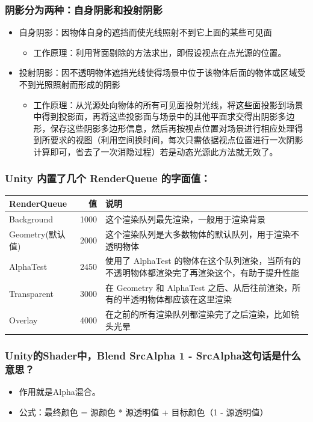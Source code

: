 \documentclass[9pt, b5paper]{article}
\begin{document}
\subsubsection{阴影分为两种：自身阴影和投射阴影}
\label{sec:org9d515b5}
\begin{itemize}
\item 自身阴影：因物体自身的遮挡而使光线照射不到它上面的某些可见面
\begin{itemize}
\item 工作原理：利用背面剔除的方法求出，即假设视点在点光源的位置。
\end{itemize}
\item 投射阴影：因不透明物体遮挡光线使得场景中位于该物体后面的物体或区域受不到光照照射而形成的阴影
\begin{itemize}
\item 工作原理：从光源处向物体的所有可见面投射光线，将这些面投影到场景中得到投影面，再将这些投影面与场景中的其他平面求交得出阴影多边形，保存这些阴影多边形信息，然后再按视点位置对场景进行相应处理得到所要求的视图（利用空间换时间，每次只需依据视点位置进行一次阴影计算即可，省去了一次消隐过程）若是动态光源此方法就无效了。
\end{itemize}
\end{itemize}
\subsubsection{Unity 内置了几个 RenderQueue 的字面值：}
\label{sec:orgd43ab68}
\begin{center}
\begin{tabular}{lrl}
\hline
RenderQueue & 值 & 说明\\
\hline
Background & 1000 & 这个渲染队列最先渲染，一般用于渲染背景\\
Geometry(默认值) & 2000 & 这个渲染队列是大多数物体的默认队列，用于渲染不透明物体\\
AlphaTest & 2450 & 使用了 AlphaTest 的物体在这个队列渲染，当所有的不透明物体都渲染完了再渲染这个，有助于提升性能\\
Transparent & 3000 & 在 Geometry 和 AlphaTest 之后、从后往前渲染，所有的半透明物体都应该在这里渲染\\
Overlay & 4000 & 在之前的所有渲染队列都渲染完了之后渲染，比如镜头光晕\\
\hline
\end{tabular}
\end{center}
\subsubsection{Unity的Shader中，Blend SrcAlpha 1 - SrcAlpha这句话是什么意思？}
\label{sec:orgcd1b09d}
\begin{itemize}
\item 作用就是Alpha混合。
\item 公式：最终颜色 = 源颜色 * 源透明值 + 目标颜色（1 - 源透明值）
\end{itemize}
\end{document}
